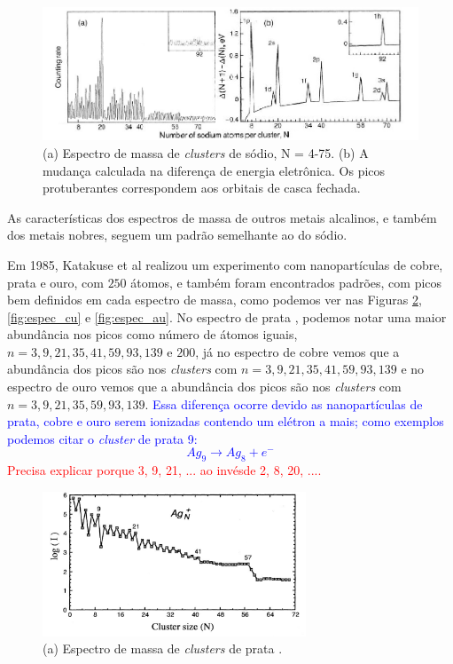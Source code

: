 \begin{figure}
  \centering
  \includegraphics[width=1\textwidth]{images/clusters/NA_knight}
  \caption{(a) Espectro de massa de \textit{clusters} de sódio, N = 4-75.
  (b) A mudança calculada na diferença de energia eletrônica. Os picos protuberantes correspondem aos orbitais de casca fechada.\cite{electronic_Shell_sodium}  }
  \label{fig:espec_na}
\end{figure}


As características dos espectros de massa de outros metais alcalinos, e também dos metais nobres, seguem um padrão semelhante ao do sódio.

Em 1985, Katakuse et al \cite{KATAKUSE1985229} realizou um experimento com nanopartículas de cobre, prata e ouro, com $250$ átomos, e também foram encontrados padrões, com picos bem definidos em cada espectro de massa, como podemos ver nas Figuras \ref{fig:espec_ag},\ref{fig:espec_cu} e \ref{fig:espec_au}. No espectro de prata , podemos notar uma maior abundância nos picos como número de átomos iguais, $n= 3,9,21,35,41,59,93,139$ e $200$, já no espectro de cobre vemos que a abundância dos picos são nos \textit{clusters} com $n= 3,9,21,35,41,59,93,139$ e no espectro de ouro vemos que a abundância dos picos são nos \textit{clusters} com $n= 3,9,21,35,59,93,139$. \textcolor{blue}{Essa diferença ocorre devido as nanopartículas de prata, cobre e ouro serem ionizadas contendo um elétron a mais; como exemplos podemos citar o \textit{cluster} de prata 9:
\begin{equation*}
    Ag_{9} \to Ag_{8} + e^{-}
\end{equation*}} \textcolor{red}{Precisa explicar porque 3, 9, 21, ... ao invésde 2, 8, 20, ....}






\begin{figure}
  \centering
  \includegraphics[width=0.7\textwidth]{images/clusters/espec_ag}
  \caption{(a) Espectro de massa de \textit{clusters} de prata \cite{Heer}.  }
  \label{fig:espec_ag}
\end{figure}

